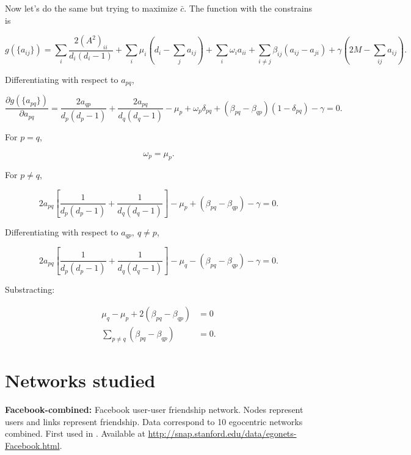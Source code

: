 \documentclass{article}
\begin{document}
Now let's do the same but trying to maximize $\bar{c}$. The function with the constrains is 

\begin{equation}
    g(\lbrace a_{ij} \rbrace) = \sum_{i} \dfrac{2 (A^2)_{ii}}{d_i (d_i-1)} + \sum_i \mu_i \left(d_i - \sum_j a_{ij} \right) + \sum_i \omega_i a_{ii} + \sum_{i\neq j} \beta_{ij} (a_{ij}-a_{ji}) + \gamma \left(2M - \sum_{ij} a_{ij} \right).
\end{equation}

Differentiating with respect to $a_{pq}$,

\begin{equation}
    \dfrac{\partial g(\lbrace a_{pq} \rbrace)}{\partial a_{pq}} = \dfrac{2 a_{qp} }{d_p (d_p - 1)} + \dfrac{2 a_{pq}}{d_q (d_q - 1)} - \mu_p + \omega_p \delta_{pq} + (\beta_{pq} - \beta_{qp}) (1-\delta_{pq}) - \gamma = 0.
\end{equation}

For $p=q$,

\begin{equation}
    \omega_p = \mu_p.
\end{equation}

For $p\neq q$,

\begin{equation}
    2 a_{pq}\left[\dfrac{1}{d_p (d_p - 1)} + \dfrac{1}{d_q (d_q - 1)} \right]- \mu_p + (\beta_{pq} - \beta_{qp}) - \gamma = 0.
\end{equation}

Differentiating with respect to $a_{qp},\: q\neq p$,

\begin{equation}
    2 a_{pq}\left[\dfrac{1}{d_p (d_p - 1)} + \dfrac{1}{d_q (d_q - 1)} \right]- \mu_q - (\beta_{pq} - \beta_{qp}) - \gamma = 0.
\end{equation}

Substracting:

\begin{align}
    \mu_q - \mu_p + 2 (\beta_{pq} - \beta_{qp}) &= 0 \nonumber \\
    \sum_{p\neq q}(\beta_{pq} - \beta_{qp}) &= 0.
\end{align}

\section{Networks studied} \label{app:NetworksStudied}

\textbf{Facebook-combined:} Facebook user-user friendship network. Nodes represent users and links represent friendship. Data correspond to 10 egocentric networks combined. First used in \cite{Leskovec2012LearningNetworks}. Available at \url{http://snap.stanford.edu/data/egonets-Facebook.html}.\\
\end{document}
